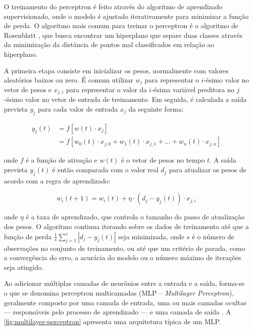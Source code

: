 
O treinamento do perceptron é feito através do algoritmo de aprendizado supervisionado, onde o modelo é ajustado iterativamente para minimizar a função de perda. O algoritmo mais comum para treinar o perceptron é o algoritmo de Rosenblatt \citep{Rosenblatt1958}, que busca encontrar um hiperplano que separe duas classes através da minimização da distância de pontos mal classificados em relação ao hiperplano.

A primeira etapa consiste em inicializar os pesos, normalmente com valores aleatórios baixos ou zero. É comum utilizar $w_i$ para representar o $i$-ésimo valor no vetor de pesos e $x_{j,i}$ para representar o valor da $i$-ésima variável preditora no $j$-ésimo valor no vetor de entrada de treinamento. Em seguida, é calculada a saída prevista $y_j$ para cada valor de entrada $x_j$ da seguinte forma:

\begin{equation}
    \begin{split}
        y_j(t) &= f[w(t) \cdot x_j] \\
        &= f[w_0(t) \cdot x_{j,0} + w_1(t) \cdot x_{j,1} + ... + w_n(t) \cdot x_{j,n}]
    \end{split}
\end{equation}

onde $f$ é a função de ativação e $w(t)$ é o vetor de pesos no tempo $t$. A saída prevista $y_j(t)$ é então comparada com o valor real $d_j$ para atualizar os pesos de acordo com a regra de aprendizado:

\begin{equation}
    w_i(t+1) = w_i(t) + \eta \cdot (d_j - y_j(t)) \cdot x_{j,i}
\end{equation}

onde $\eta$ é a taxa de aprendizado, que controla o tamanho do passo de atualização dos pesos. O algoritmo continua iterando sobre os dados de treinamento até que a função de perda $\frac{1}{s} \sum_{j=1}^{s} |d_j - y_j(t)|$ seja minimizada, onde $s$ é o número de observações no conjunto de treinamento, ou até que um critério de parada, como a convergência do erro, a acurácia do modelo ou o número máximo de iterações seja atingido.


Ao adicionar múltiplas camadas de neurônios entre a entrada e a saída, forma-se o que se denomina perceptron multicamadas (MLP – \textit{Multilayer Perceptron}), geralmente composto por uma camada de entrada, uma ou mais camadas ocultas — responsáveis pelo processo de aprendizado — e uma camada de saída \citep{Sarker2021}. A \autoref{fig:multilayer-perceptron} apresenta uma arquitetura típica de um MLP.

